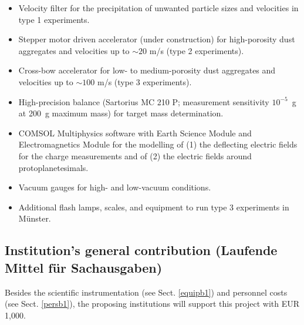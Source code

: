 \begin{itemize}
\item Velocity filter for the precipitation of unwanted particle
sizes and velocities in type 1 experiments.

\item Stepper motor driven accelerator (under construction) for
high-porosity dust aggregates and velocities up to $\sim 20$ m/s
(type 2 experiments).

\item Cross-bow accelerator for low- to medium-porosity dust
aggregates and velocities up to $\sim 100$ m/s (type 3
experiments).

\item High-precision balance (Sartorius MC 210 P; measurement
sensitivity $10^{-5}$~g at 200~g maximum mass) for target mass
determination.

\item COMSOL Multiphysics software with Earth Science Module and
Electromagnetics Module for the modelling of (1) the deflecting
electric fields for the charge measurements and of (2) the
electric fields around protoplanetesimals.

\item Vacuum gauges for high- and low-vacuum conditions.

\item Additional flash lamps, scales, and equipment to run type 3
experiments in M\"unster.

\end{itemize}


\subsection{Institution's general contribution (Laufende Mittel f\"ur Sachausgaben)}

Besides the scientific instrumentation (see Sect. \ref{equipb1})
and personnel costs (see Sect. \ref{persb1}), the proposing
institutions will support this project with EUR 1,000.

%
%





